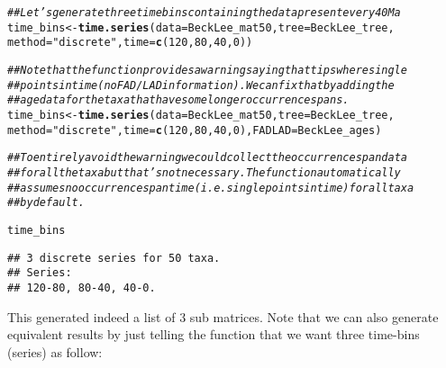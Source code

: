 \documentclass{article}\usepackage[]{graphicx}\usepackage[]{color}
\makeatletter
\newcommand{\hlnum}[1]{\textcolor[rgb]{0.686,0.059,0.569}{#1}}%
\newcommand{\hlstr}[1]{\textcolor[rgb]{0.192,0.494,0.8}{#1}}%
\newcommand{\hlcom}[1]{\textcolor[rgb]{0.678,0.584,0.686}{\textit{#1}}}%
\newcommand{\hlstd}[1]{\textcolor[rgb]{0.345,0.345,0.345}{#1}}%
\newcommand{\hlkwb}[1]{\textcolor[rgb]{0.69,0.353,0.396}{#1}}%
\newcommand{\hlkwc}[1]{\textcolor[rgb]{0.333,0.667,0.333}{#1}}%
\newcommand{\hlkwd}[1]{\textcolor[rgb]{0.737,0.353,0.396}{\textbf{#1}}}%
\newenvironment{kframe}{%
 \def\at@end@of@kframe{}%
 \ifinner\ifhmode%
  \def\at@end@of@kframe{\end{minipage}}%
  \begin{minipage}{\columnwidth}%
 \fi\fi%
 \def\FrameCommand##1{\hskip\@totalleftmargin \hskip-\fboxsep
 \colorbox{shadecolor}{##1}\hskip-\fboxsep
     \hskip-\linewidth \hskip-\@totalleftmargin \hskip\columnwidth}%
 \MakeFramed {\advance\hsize-\width
   \@totalleftmargin\z@ \linewidth\hsize
   \@setminipage}}%
 {\par\unskip\endMakeFramed%
 \at@end@of@kframe}
\newenvironment{knitrout}{}{} %
\makeatother
\begin{document}
\begin{knitrout}
\color{fgcolor}\begin{kframe}
\begin{alltt}
\hlcom{## Let's generate three time bins containing the data present every 40 Ma}
\hlstd{time_bins} \hlkwb{<-} \hlkwd{time.series}\hlstd{(}\hlkwc{data} \hlstd{= BeckLee_mat50,} \hlkwc{tree} \hlstd{= BeckLee_tree,}
    \hlkwc{method} \hlstd{=} \hlstr{"discrete"}\hlstd{,} \hlkwc{time} \hlstd{=} \hlkwd{c}\hlstd{(}\hlnum{120}\hlstd{,} \hlnum{80}\hlstd{,} \hlnum{40}\hlstd{,} \hlnum{0}\hlstd{))}
\end{alltt}


{\ttfamily\noindent\itshape\color{messagecolor}{\#\# No FADLAD table has been provided so every tip is assumed to interval single points in time.}}\begin{alltt}
\hlcom{## Note that the function provides a warning saying that tips where single}
\hlcom{## points in time (no FAD/LAD information). We can fix that by adding the}
\hlcom{## age data for the taxa that have some longer occurrence spans.}
\hlstd{time_bins} \hlkwb{<-} \hlkwd{time.series}\hlstd{(}\hlkwc{data} \hlstd{= BeckLee_mat50,} \hlkwc{tree} \hlstd{= BeckLee_tree,}
    \hlkwc{method} \hlstd{=} \hlstr{"discrete"}\hlstd{,} \hlkwc{time} \hlstd{=} \hlkwd{c}\hlstd{(}\hlnum{120}\hlstd{,} \hlnum{80}\hlstd{,} \hlnum{40}\hlstd{,} \hlnum{0}\hlstd{),} \hlkwc{FADLAD} \hlstd{= BeckLee_ages)}
\end{alltt}


{\ttfamily\noindent\itshape\color{messagecolor}{\#\# Some tips have FAD/LAD and are assumed to interval single points in time.}}\begin{alltt}
\hlcom{## To entirely avoid the warning we could collect the occurrence span data}
\hlcom{## for all the taxa but that's not necessary. The function automatically}
\hlcom{## assumes no occurrence span time (i.e. single points in time) for all taxa}
\hlcom{## by default.}

\hlstd{time_bins}
\end{alltt}
\begin{verbatim}
## 3 discrete series for 50 taxa. 
## Series:
## 120-80, 80-40, 40-0.
\end{verbatim}
\end{kframe}
\end{knitrout}

This generated indeed a list of 3 sub matrices.
Note that we can also generate equivalent results by just telling the function that we want three time-bins (series) as follow: 
\end{document}
